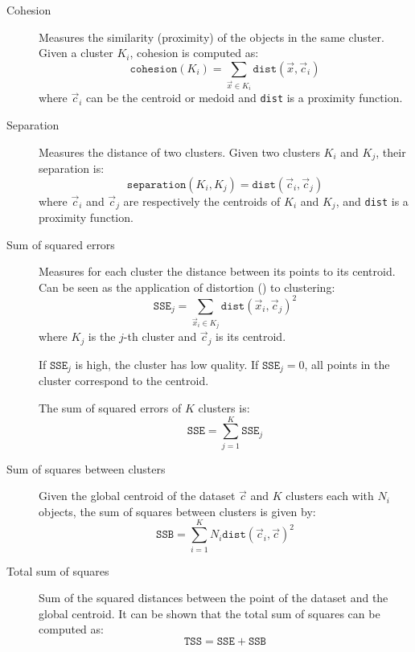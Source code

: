 \begin{description}
    \item[Cohesion] 
        Measures the similarity (proximity) of the objects in the same cluster.
        Given a cluster $K_i$, cohesion is computed as:
        \[ \texttt{cohesion}(K_i) = \sum_{\vec{x} \in K_i} \texttt{dist}(\vec{x}, \vec{c}_i) \]
        where $\vec{c}_i$ can be the centroid or medoid
        and \texttt{dist} is a proximity function.

    \item[Separation] 
        Measures the distance of two clusters.
        Given two clusters $K_i$ and $K_j$, their separation is:
        \[ \texttt{separation}(K_i, K_j) = \texttt{dist}(\vec{c}_i, \vec{c}_j) \]
        where $\vec{c}_i$ and $\vec{c}_j$ are respectively the centroids of $K_i$ and $K_j$, and \texttt{dist} is a proximity function.

    \item[Sum of squared errors] 
        Measures for each cluster the distance between its points to its centroid.
        Can be seen as the application of distortion () to clustering:
        \[ \texttt{SSE}_j = \sum_{\vec{x}_i \in K_j} \texttt{dist}(\vec{x}_i, \vec{c}_j)^2 \]
        where $K_j$ is the $j$-th cluster and $\vec{c}_j$ is its centroid.

        If $\texttt{SSE}_j$ is high, the cluster has low quality.
        If $\texttt{SSE}_j = 0$, all points in the cluster correspond to the centroid.

        The sum of squared errors of $K$ clusters is:
        \[ \texttt{SSE} = \sum_{j=1}^{K} \texttt{SSE}_j \]

    \item[Sum of squares between clusters] 
        Given the global centroid of the dataset $\vec{c}$ and
        $K$ clusters each with $N_i$ objects,
        the sum of squares between clusters is given by:
        \[ \texttt{SSB} = \sum_{i=1}^{K} N_i \texttt{dist}(\vec{c}_i, \vec{c})^2 \]

    \item[Total sum of squares] 
        Sum of the squared distances between the point of the dataset and the global centroid.
        It can be shown that the total sum of squares can be computed as:
        \[ \texttt{TSS} = \texttt{SSE} + \texttt{SSB} \]


\end{description}
